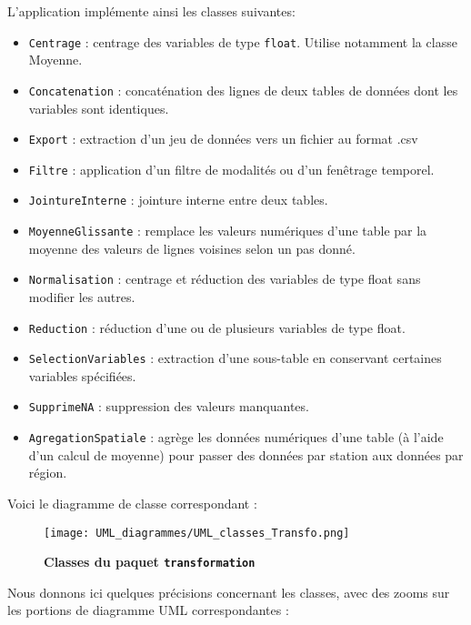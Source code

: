 \documentclass[11pt]{article}
\begin{document}
L'application implémente ainsi les classes suivantes:  
\begin{itemize}
    \item \texttt{Centrage} : centrage des variables de type \texttt{float}. Utilise notamment la classe Moyenne.
    \item \texttt{Concatenation} : concaténation des lignes de deux tables de données dont les variables sont identiques.
    \item \texttt{Export} : extraction d'un jeu de données vers un fichier au format .csv
    \item \texttt{Filtre} : application d'un filtre de modalités ou d'un fenêtrage temporel. 
    \item \texttt{JointureInterne} : jointure interne entre deux tables. 
    \item \texttt{MoyenneGlissante} : remplace les valeurs numériques d'une table par la moyenne des valeurs de lignes voisines selon un pas donné. %
    \item \texttt{Normalisation} : centrage et réduction des variables de type float sans modifier les autres. 
    \item \texttt{Reduction} : réduction d'une ou de plusieurs variables de type float.
    \item \texttt{SelectionVariables} : extraction d'une sous-table en conservant certaines variables spécifiées.
    \item \texttt{SupprimeNA} : suppression des valeurs manquantes. 
    \item \texttt{AgregationSpatiale} : agrège les données numériques d'une table (à l'aide d'un calcul de moyenne) pour passer des données par station aux données par région. 
    
\end{itemize}

Voici le diagramme de classe correspondant : 
\begin{figure}[H]
    \caption{\textbf{Classes du paquet \texttt{transformation}}}
    \label{UML_classe_transfo}
    \centering
    \texttt{[image: UML\_diagrammes/UML\_classes\_Transfo.png]}
\end{figure}

Nous donnons ici quelques précisions concernant les classes, avec des zooms sur les portions de diagramme UML correspondantes : 
\end{document}
